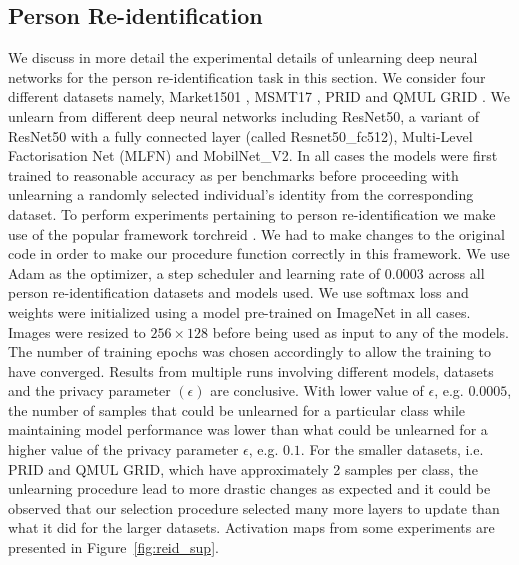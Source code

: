 \subsection{Person Re-identification}
We discuss in more detail the experimental details of unlearning deep neural networks for the person re-identification task in this section. We consider four different datasets namely, Market1501 \citep{zheng2015scalable}, MSMT17 \citep{wei2018person}, PRID \citep{hirzer11} and  QMUL GRID \citep{loy2009multi}. We unlearn from different deep neural networks including ResNet50, a variant of ResNet50 with a fully connected layer (called Resnet50\_fc512), Multi-Level Factorisation Net (MLFN) and MobilNet\_V2. In all cases the models were first trained to reasonable accuracy as per benchmarks before proceeding with unlearning a randomly selected individual's identity from the corresponding dataset. To perform experiments pertaining to person re-identification we make use of the popular framework torchreid \citep{zhou2019omni}. We had to make changes to the original code in order to make our procedure function correctly in this framework. We use Adam as the optimizer, a step scheduler and learning rate of $0.0003$ across all person re-identification datasets and models used. We use softmax loss and weights were initialized using a model pre-trained on ImageNet in all cases. Images were resized to $256 \times 128$ before being used as input to any of the models. The number of training epochs was chosen accordingly to allow the training to have converged. Results from multiple runs involving different models, datasets and the privacy parameter $(\epsilon)$ are conclusive. With lower value of $\epsilon$, e.g. $0.0005$, the number of samples that could be unlearned for a particular class while maintaining model performance was lower than what could be unlearned for a higher value of the privacy parameter $\epsilon$, e.g. $0.1$. For the smaller datasets, i.e. PRID and QMUL GRID, which have approximately 2 samples per class, the unlearning procedure lead to more drastic changes as expected and it could be observed that our selection procedure selected many more layers to update than what it did for the larger datasets. Activation maps from some experiments are presented in Figure~\ref{fig:reid_sup}.

